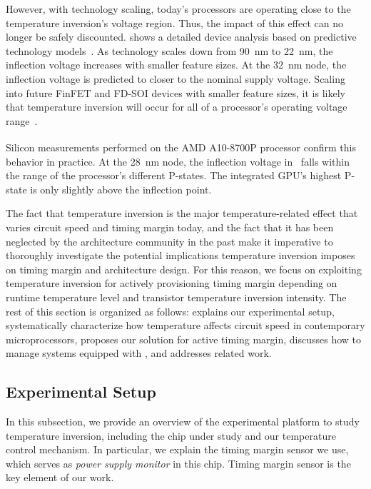 However, with technology scaling, today's processors are operating close to the temperature inversion's voltage region. Thus, the impact of this effect can no longer be safely discounted.  shows a detailed device analysis based on predictive technology models~\cite{wolpert2012temperature,zhao2006new}. As technology scales down from 90~nm to 22~nm, the inflection voltage increases with smaller feature sizes. At the 32~nm node, the inflection voltage is predicted to closer to the nominal supply voltage. Scaling into future FinFET and FD-SOI devices with smaller feature sizes, it is likely that temperature inversion will occur for all of a processor's operating voltage range~\cite{lee2014dynamic,cai2015tei}.

Silicon measurements performed on the AMD\textsuperscript{\textregistered} A10-8700P processor confirm this behavior in practice. At the 28~nm node, the inflection voltage in~ falls within the range of the processor's different P-states. The integrated GPU's highest P-state is only slightly above the inflection point. 

The fact that temperature inversion is the major temperature-related effect that varies circuit speed and timing margin today, and the fact that it has been neglected by the architecture community in the past make it imperative to thoroughly investigate the potential implications temperature inversion imposes on timing margin and architecture design. For this reason, we focus on exploiting temperature inversion for actively provisioning timing margin depending on runtime temperature level and transistor temperature inversion intensity. The rest of this section is organized as follows:  explains our experimental setup,  systematically characterize how temperature affects circuit speed in contemporary microprocessors,  proposes our \tistate solution for active timing margin,  discusses how to manage systems equipped with \tistates, and  addresses related work.

\subsection{Experimental Setup}
\label{sec:tistate:setup}

In this subsection, we provide an overview of the experimental platform to study temperature inversion, including the chip under study and our temperature control mechanism. In particular, we explain the timing margin sensor we use, which serves as \textit{power supply monitor} in this chip. Timing margin sensor is the key element of our work.

